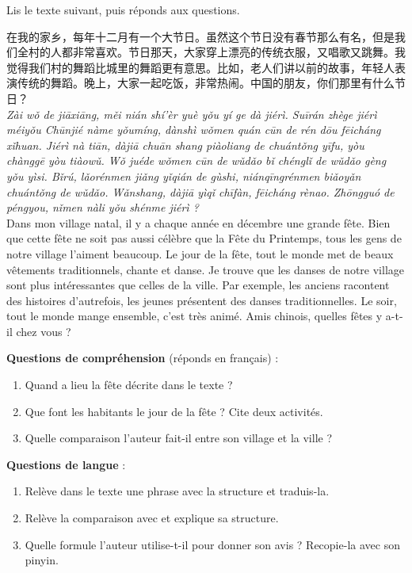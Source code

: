 \documentclass[11pt]{article}
\newcommand{\zh}[1]{\ifmmode\text{#1}\else{#1}\fi}
\begin{document}
\begin{exercice}
Lis le texte suivant, puis réponds aux questions.

\begin{textebox}
在我的家乡，每年十二月有一个大节日。虽然这个节日没有春节那么有名，但是我们全村的人都非常喜欢。节日那天，大家穿上漂亮的传统衣服，又唱歌又跳舞。我觉得我们村的舞蹈比城里的舞蹈更有意思。比如，老人们讲以前的故事，年轻人表演传统的舞蹈。晚上，大家一起吃饭，非常热闹。中国的朋友，你们那里有什么节日？\\
\emph{Zài wǒ de jiāxiāng, měi nián shí'èr yuè yǒu yí ge dà jiérì. Suīrán zhège jiérì méiyǒu Chūnjié nàme yǒumíng, dànshì wǒmen quán cūn de rén dōu fēicháng xǐhuan. Jiérì nà tiān, dàjiā chuān shang piàoliang de chuántǒng yīfu, yòu chànggē yòu tiàowǔ. Wǒ juéde wǒmen cūn de wǔdǎo bǐ chénglǐ de wǔdǎo gèng yǒu yìsi. Bǐrú, lǎorénmen jiǎng yǐqián de gùshi, niánqīngrénmen biǎoyǎn chuántǒng de wǔdǎo. Wǎnshang, dàjiā yìqǐ chīfàn, fēicháng rènao. Zhōngguó de péngyou, nǐmen nàli yǒu shénme jiérì ?}\\
Dans mon village natal, il y a chaque année en décembre une grande fête. Bien que cette fête ne soit pas aussi célèbre que la Fête du Printemps, tous les gens de notre village l'aiment beaucoup. Le jour de la fête, tout le monde met de beaux vêtements traditionnels, chante et danse. Je trouve que les danses de notre village sont plus intéressantes que celles de la ville. Par exemple, les anciens racontent des histoires d'autrefois, les jeunes présentent des danses traditionnelles. Le soir, tout le monde mange ensemble, c'est très animé. Amis chinois, quelles fêtes y a-t-il chez vous ?
\end{textebox}

\textbf{Questions de compréhension} (réponds en français) :
\begin{enumerate}
\item Quand a lieu la fête décrite dans le texte ?
\item Que font les habitants le jour de la fête ? Cite deux activités.
\item Quelle comparaison l'auteur fait-il entre son village et la ville ?
\end{enumerate}

\textbf{Questions de langue} :
\begin{enumerate}
\item Relève dans le texte une phrase avec la structure \zh{虽然……但是……} et traduis-la.
\item Relève la comparaison avec \zh{比} et explique sa structure.
\item Quelle formule l'auteur utilise-t-il pour donner son avis ? Recopie-la avec son pinyin.
\end{enumerate}
\end{exercice}
\end{document}
